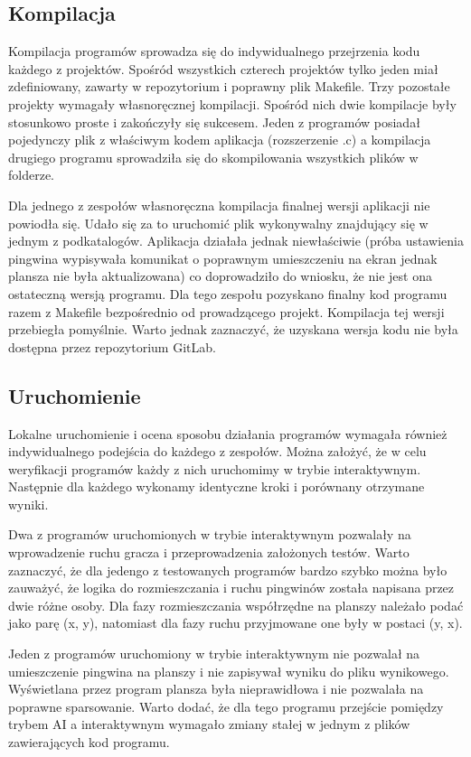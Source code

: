 \subsection{Kompilacja}

Kompilacja programów sprowadza się do indywidualnego przejrzenia kodu każdego z projektów.
Spośród wszystkich czterech projektów tylko jeden miał zdefiniowany, zawarty w repozytorium i poprawny plik Makefile.
Trzy pozostałe projekty wymagały własnoręcznej kompilacji.
Spośród nich dwie kompilacje były stosunkowo proste i zakończyły się sukcesem.
Jeden z programów posiadał pojedynczy plik z właściwym kodem aplikacja (rozszerzenie .c) a kompilacja drugiego programu sprowadziła się do skompilowania wszystkich plików w folderze.

Dla jednego z zespołów własnoręczna kompilacja finalnej wersji aplikacji nie powiodła się.
Udało się za to uruchomić plik wykonywalny znajdujący się w jednym z podkatalogów.
Aplikacja działała jednak niewłaściwie (próba ustawienia pingwina wypisywała komunikat o poprawnym umieszczeniu na ekran jednak plansza nie była aktualizowana) co doprowadziło do wniosku, że nie jest ona ostateczną wersją programu.
Dla tego zespołu pozyskano finalny kod programu razem z Makefile bezpośrednio od prowadzącego projekt.
Kompilacja tej wersji przebiegła pomyślnie.
Warto jednak zaznaczyć, że uzyskana wersja kodu nie była dostępna przez repozytorium GitLab.

\subsection{Uruchomienie}

Lokalne uruchomienie i ocena sposobu działania programów wymagała również indywidualnego podejścia do każdego z zespołów.
Można założyć, że w celu weryfikacji programów każdy z nich uruchomimy w trybie interaktywnym.
Następnie dla każdego wykonamy identyczne kroki i porównany otrzymane wyniki.

Dwa z programów uruchomionych w trybie interaktywnym pozwalały na wprowadzenie ruchu gracza i przeprowadzenia założonych testów.
Warto zaznaczyć, że dla jedengo z testowanych programów bardzo szybko można było zauważyć, że logika do rozmieszczania i ruchu pingwinów została napisana przez dwie różne osoby.
Dla fazy rozmieszczania współrzędne na planszy należało podać jako parę (x, y), natomiast dla fazy ruchu przyjmowane one były w postaci (y, x).

Jeden z programów uruchomiony w trybie interaktywnym nie pozwalał na umieszczenie pingwina na planszy i nie zapisywał wyniku do pliku wynikowego.
Wyświetlana przez program plansza była nieprawidłowa i nie pozwalała na poprawne sparsowanie.
Warto dodać, że dla tego programu przejście pomiędzy trybem AI a interaktywnym wymagało zmiany stałej w jednym z plików zawierających kod programu.

